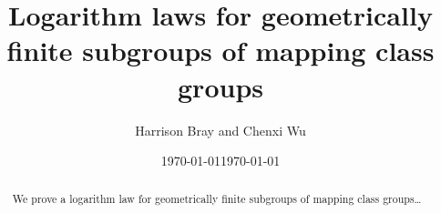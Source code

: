 \documentclass[11pt]{amsart}
\date{\today}
\theoremstyle{plain}
\theoremstyle{definition}
\theoremstyle{remark}
\begin{document}
\title{Logarithm laws for geometrically finite subgroups of mapping class
groups}
\author{Harrison Bray and Chenxi Wu}
\date{\today}
\keywords{}
\subjclass[2020]{}

\begin{abstract} We prove a logarithm law for geometrically finite
  subgroups of mapping class groups\dots
\end{abstract}

\maketitle


\tableofcontents


\cite{masur93}




\end{document}
